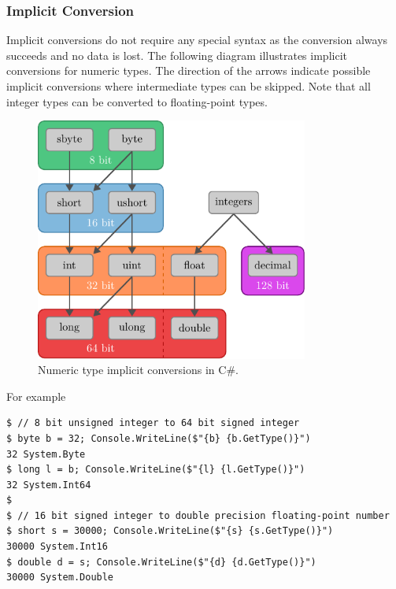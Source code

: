 \documentclass{article}
\begin{document}
\subsubsection{Implicit Conversion}
Implicit conversions do not require any special syntax as the conversion
always succeeds and no data is lost.
The following diagram illustrates implicit conversions for numeric types.
The direction of the arrows indicate possible implicit conversions where
intermediate types can be skipped.
Note that all integer types can be converted to floating-point types.
\begin{figure}[H]
    \centering
    \includegraphics[height = 8cm, keepaspectratio = true]{figures/implicit_conversions.pdf}
    \caption{Numeric type implicit conversions in C\#.}
\end{figure}
For example
\begin{lstlisting}
$ // 8 bit unsigned integer to 64 bit signed integer 
$ byte b = 32; Console.WriteLine($"{b} {b.GetType()}")
32 System.Byte
$ long l = b; Console.WriteLine($"{l} {l.GetType()}")
32 System.Int64
$ 
$ // 16 bit signed integer to double precision floating-point number
$ short s = 30000; Console.WriteLine($"{s} {s.GetType()}")
30000 System.Int16
$ double d = s; Console.WriteLine($"{d} {d.GetType()}")
30000 System.Double
\end{lstlisting}
\end{document}
